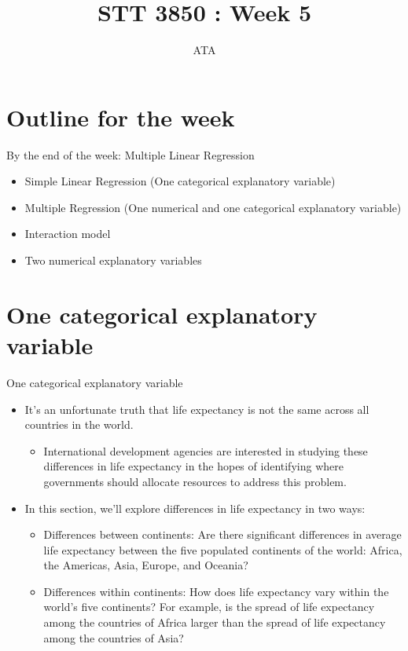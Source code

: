 \documentclass[
  ignorenonframetext,
]{beamer}
\title{STT 3850 : Week 5}
\author{ATA}
\date{}
\institute{Appalachian State University}
\providecommand{\tightlist}{%
  \setlength{\itemsep}{0pt}\setlength{\parskip}{0pt}}
\begin{document}
\frame{\titlepage}

\section{Outline for the week}\label{outline-for-the-week}

\begin{frame}{By the end of the week: Multiple Linear Regression}
\label{by-the-end-of-the-week-multiple-linear-regression}
\begin{itemize}
\tightlist
\item
  Simple Linear Regression (One categorical explanatory variable)
\item
  Multiple Regression (One numerical and one categorical explanatory
  variable)
\item
  Interaction model
\item
  Two numerical explanatory variables
\end{itemize}
\end{frame}

\section{One categorical explanatory
variable}\label{one-categorical-explanatory-variable}

\begin{frame}{One categorical explanatory variable}
\label{one-categorical-explanatory-variable-1}
\begin{itemize}
\item
  It's an unfortunate truth that life expectancy is not the same across
  all countries in the world.

  \begin{itemize}
  \tightlist
  \item
    International development agencies are interested in studying these
    differences in life expectancy in the hopes of identifying where
    governments should allocate resources to address this problem.
  \end{itemize}
\item
  In this section, we'll explore differences in life expectancy in two
  ways:

  \begin{itemize}
  \tightlist
  \item
    Differences between continents: Are there significant differences in
    average life expectancy between the five populated continents of the
    world: Africa, the Americas, Asia, Europe, and Oceania?
  \item
    Differences within continents: How does life expectancy vary within
    the world's five continents? For example, is the spread of life
    expectancy among the countries of Africa larger than the spread of
    life expectancy among the countries of Asia?
  \end{itemize}
\end{itemize}
\end{frame}
\end{document}
